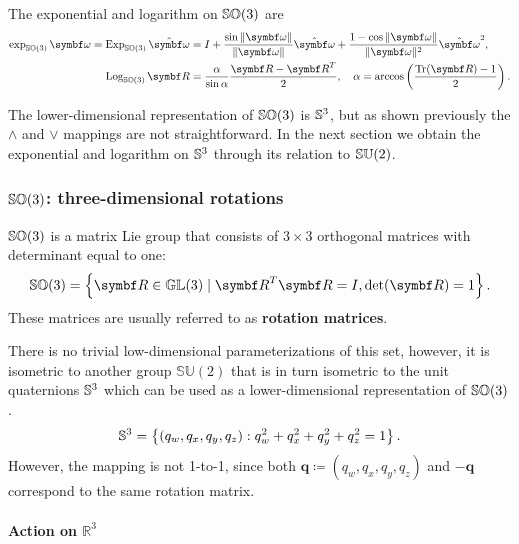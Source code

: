 \begin{important}
  The exponential and logarithm on ${\mathbb{SO}(3)}$ are
  \begin{subequations}
    \begin{align}
      \exp_\SOthree \bomega = \Exp_\SOthree \hat {\bomega} & = I + \frac{\sin \| \bomega \|}{\|\bomega \|} \hat {\bomega} + \frac{1 - \cos \| \bomega \|}{\| \bomega \|^2} \hat {\bomega}^2, \\
      \Log_\SOthree \bR                                    & = \frac{\alpha}{\sin \alpha} \frac{\bR - \bR^T}{2}, \quad \alpha = \arccos \left( \frac{\tr(\bR) - 1}{2} \right).
    \end{align}
  \end{subequations}
\end{important}
The lower-dimensional representation of ${\mathbb{SO}(3)}$ is ${\mathbb{S}^3}$, but as shown previously the $\wedge$ and $\vee$ mappings are not straightforward. In the next section we obtain the exponential and logarithm on ${\mathbb{S}^3}$ through its relation to ${\mathbb{SU}(2)}$.

\subsubsection{\texorpdfstring{${\mathbb{SO}(3)}$}{SO(3)}: three-dimensional rotations}

${\mathbb{SO}(3)}$ is a matrix Lie group that consists of $3 \times 3$ orthogonal matrices with determinant equal to one:
\begin{equation}
  \SOthree = \left\{ \bR \in \mathbb{GL}(3) \mid \bR^T \bR = I, \det(\bR) = 1  \right\}.
\end{equation}
These matrices are usually referred to as \textbf{rotation matrices}.

There is no trivial low-dimensional parameterizations of this set, however, it is isometric to another group $\mathbb{SU}(2)$ that is in turn isometric to the unit quaternions ${\mathbb{S}^3}$ which can be used as a lower-dimensional representation of ${\mathbb{SO}(3)}$.
\begin{equation}
  {\mathbb{S}^3} = \left \{ (q_w, q_x, q_y, q_z)  : q_w^2 + q_x^2 + q_y^2 + q_z^2 = 1 \right\}.
\end{equation}
However, the mapping is not 1-to-1, since both $\symbf{q} \coloneq (q_w, q_x, q_y, q_z)$ and $-\symbf{q}$ correspond to the same rotation matrix.


\paragraph{Action on \texorpdfstring{$\mathbb{R}^3$}{R3}}

